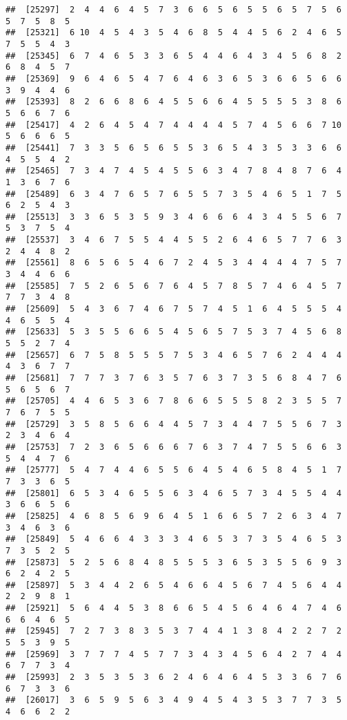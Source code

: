 \documentclass[
]{book}
\begin{document}
\begin{verbatim}
##  [25297]  2  4  4  6  4  5  7  3  6  6  5  6  5  5  6  5  7  5  6  5  7  5  8  5
##  [25321]  6 10  4  5  4  3  5  4  6  8  5  4  4  5  6  2  4  6  5  7  5  5  4  3
##  [25345]  6  7  4  6  5  3  3  6  5  4  4  6  4  3  4  5  6  8  2  6  8  4  5  7
##  [25369]  9  6  4  6  5  4  7  6  4  6  3  6  5  3  6  6  5  6  6  3  9  4  4  6
##  [25393]  8  2  6  6  8  6  4  5  5  6  6  4  5  5  5  5  3  8  6  5  6  6  7  6
##  [25417]  4  2  6  4  5  4  7  4  4  4  4  5  7  4  5  6  6  7 10  5  6  6  6  5
##  [25441]  7  3  3  5  6  5  6  5  5  3  6  5  4  3  5  3  3  6  6  4  5  5  4  2
##  [25465]  7  3  4  7  4  5  4  5  5  6  3  4  7  8  4  8  7  6  4  1  3  6  7  6
##  [25489]  6  3  4  7  6  5  7  6  5  5  7  3  5  4  6  5  1  7  5  6  2  5  4  3
##  [25513]  3  3  6  5  3  5  9  3  4  6  6  6  4  3  4  5  5  6  7  5  3  7  5  4
##  [25537]  3  4  6  7  5  5  4  4  5  5  2  6  4  6  5  7  7  6  3  2  4  4  8  2
##  [25561]  8  6  5  6  5  4  6  7  2  4  5  3  4  4  4  4  7  5  7  3  4  4  6  6
##  [25585]  7  5  2  6  5  6  7  6  4  5  7  8  5  7  4  6  4  5  7  7  7  3  4  8
##  [25609]  5  4  3  6  7  4  6  7  5  7  4  5  1  6  4  5  5  5  4  4  6  5  5  4
##  [25633]  5  3  5  5  6  6  5  4  5  6  5  7  5  3  7  4  5  6  8  5  5  2  7  4
##  [25657]  6  7  5  8  5  5  5  7  5  3  4  6  5  7  6  2  4  4  4  4  3  6  7  7
##  [25681]  7  7  7  3  7  6  3  5  7  6  3  7  3  5  6  8  4  7  6  5  6  5  6  7
##  [25705]  4  4  6  5  3  6  7  8  6  6  5  5  5  8  2  3  5  5  7  7  6  7  5  5
##  [25729]  3  5  8  5  6  6  4  4  5  7  3  4  4  7  5  5  6  7  3  2  3  4  6  4
##  [25753]  7  2  3  6  5  6  6  6  7  6  3  7  4  7  5  5  6  6  3  5  4  4  7  6
##  [25777]  5  4  7  4  4  6  5  5  6  4  5  4  6  5  8  4  5  1  7  7  3  3  6  5
##  [25801]  6  5  3  4  6  5  5  6  3  4  6  5  7  3  4  5  5  4  4  3  6  6  5  6
##  [25825]  4  6  8  5  6  9  6  4  5  1  6  6  5  7  2  6  3  4  7  3  4  6  3  6
##  [25849]  5  4  6  6  4  3  3  3  4  6  5  3  7  3  5  4  6  5  3  7  3  5  2  5
##  [25873]  5  2  5  6  8  4  8  5  5  5  3  6  5  3  5  5  6  9  3  6  2  4  2  5
##  [25897]  5  3  4  4  2  6  5  4  6  6  4  5  6  7  4  5  6  4  4  2  2  9  8  1
##  [25921]  5  6  4  4  5  3  8  6  6  5  4  5  6  4  6  4  7  4  6  6  6  4  6  5
##  [25945]  7  2  7  3  8  3  5  3  7  4  4  1  3  8  4  2  2  7  2  5  5  3  9  5
##  [25969]  3  7  7  7  4  5  7  7  3  4  3  4  5  6  4  2  7  4  4  6  7  7  3  4
##  [25993]  2  3  5  3  5  3  6  2  4  6  4  6  4  5  3  3  6  7  6  6  7  3  3  6
##  [26017]  3  6  5  9  5  6  3  4  9  4  5  4  3  5  3  7  7  3  5  4  6  6  2  2

\end{verbatim}
\end{document}
